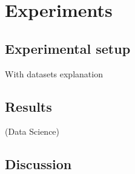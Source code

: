 \chapter{Experiments}
\label{chap:3}
\section{Experimental setup}
With datasets explanation

\section{Results}
(Data Science)

\section{Discussion}
\label{sec:moons}